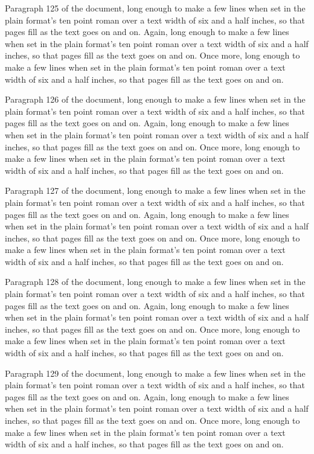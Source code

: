 Paragraph 125 of the document, long enough to make a few lines when set in the plain format's ten point roman over a text width of six and a half inches, so that pages fill as the text goes on and on. Again, long enough to make a few lines when set in the plain format's ten point roman over a text width of six and a half inches, so that pages fill as the text goes on and on. Once more, long enough to make a few lines when set in the plain format's ten point roman over a text width of six and a half inches, so that pages fill as the text goes on and on.

Paragraph 126 of the document, long enough to make a few lines when set in the plain format's ten point roman over a text width of six and a half inches, so that pages fill as the text goes on and on. Again, long enough to make a few lines when set in the plain format's ten point roman over a text width of six and a half inches, so that pages fill as the text goes on and on. Once more, long enough to make a few lines when set in the plain format's ten point roman over a text width of six and a half inches, so that pages fill as the text goes on and on.

Paragraph 127 of the document, long enough to make a few lines when set in the plain format's ten point roman over a text width of six and a half inches, so that pages fill as the text goes on and on. Again, long enough to make a few lines when set in the plain format's ten point roman over a text width of six and a half inches, so that pages fill as the text goes on and on. Once more, long enough to make a few lines when set in the plain format's ten point roman over a text width of six and a half inches, so that pages fill as the text goes on and on.

Paragraph 128 of the document, long enough to make a few lines when set in the plain format's ten point roman over a text width of six and a half inches, so that pages fill as the text goes on and on. Again, long enough to make a few lines when set in the plain format's ten point roman over a text width of six and a half inches, so that pages fill as the text goes on and on. Once more, long enough to make a few lines when set in the plain format's ten point roman over a text width of six and a half inches, so that pages fill as the text goes on and on.

Paragraph 129 of the document, long enough to make a few lines when set in the plain format's ten point roman over a text width of six and a half inches, so that pages fill as the text goes on and on. Again, long enough to make a few lines when set in the plain format's ten point roman over a text width of six and a half inches, so that pages fill as the text goes on and on. Once more, long enough to make a few lines when set in the plain format's ten point roman over a text width of six and a half inches, so that pages fill as the text goes on and on.

